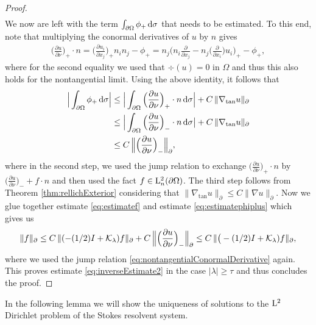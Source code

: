 \begin{proof}
\begin{align}
  \end{align}
  We now are left with the term $\int_{\partial\Omega} \phi_+ \, {\operatorname{d}\!{\sigma}}$ that needs to be estimated.
  To this end, note that multiplying the conormal derivatives of $u$ by $n$ gives
  \begin{align*}
    \Big( \frac{\partial u}{\partial \nu} \Big)_+ \cdot n
    = \Big( \frac{\partial u_i}{\partial x_j}\Big)_+ n_i n_j - \phi_+
    = n_j \Big( n_i \frac{\partial}{\partial x_j} - n_j \Big( \frac{\partial}{\partial x_i} \Big) u_i \Big)_+ - \phi_+,
  \end{align*}
  where for the second equality we used that $\div(u) = 0$ in $\Omega$ and thus this also holds for the nontangential limit.
  Using the above identity, it follows that
  \begin{align}
    \Big| \int_{\partial\Omega} \phi_+ \, {\operatorname{d}\!{\sigma}} \Big|
    &\leq \Big| \int_{\partial\Omega} \Big( \frac{\partial u}{\partial \nu} \Big)_+ \cdot n \, {\operatorname{d}\!{\sigma}} \Big|  + C\, \|\nabla_{\mathrm{tan}} u \|_{\partial} \nonumber\\
    &\leq \Big| \int_{\partial\Omega} \Big( \frac{\partial u}{\partial \nu} \Big)_- \cdot n \, {\operatorname{d}\!{\sigma}} \big| + C\, \| \nabla_{\mathrm{tan}} u\|_\partial \nonumber\\
    \label{eq:estimatephiplus}
    &\leq C\, \Big\| \Big( \frac{\partial u}{\partial \nu} \Big)_- \Big\|_\partial,
  \end{align}
  where in the second step, we used the jump relation to exchange $\big(\frac{\partial u}{\partial \nu}\big)_+ \cdot n$ by $\big(\frac{\partial u}{\partial \nu} \big)_- + f \cdot n$ and then used the fact $f \in \mathrm{L}^2_n(\partial\Omega)$.
  The third step follows from Theorem \ref{thm:rellichExterior} considering that $\|\nabla_{\mathrm{tan}} u \|_\partial \leq C \|\nabla u \|_{\partial}$.
  Now we glue together estimate \eqref{eq:estimatef} and estimate \eqref{eq:estimatephiplus} which gives us
  \begin{align*}
    \| f\|_\partial 
    \leq C \, \| ( - (1/2) I + \mathcal{K}_\lambda) f \|_\partial + C\, \Big\| \Big(\frac{\partial u}{\partial \nu} \Big)_- \Big\|_\partial 
    \leq C \, \| \big( - (1/2) I + \mathcal{K}_\lambda) f\|_{\partial},
  \end{align*}
  where we used the jump relation \eqref{eq:nontangentialConormalDerivative} again.
  This proves estimate \eqref{eq:inverseEstimate2} in the case $|\lambda| \geq \tau$ and thus concludes the proof.
\end{proof}

In the following lemma we will show the uniqueness of solutions to the $\mathrm{L}^2$ Dirichlet problem of the Stokes resolvent system.

